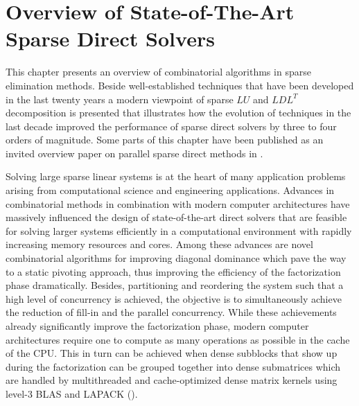 \chapter{Overview of State-of-The-Art Sparse Direct Solvers}

This chapter presents an overview of combinatorial algorithms in sparse elimination methods.
Beside well-established techniques that have been developed in the last twenty years a modern
viewpoint of sparse $LU$ and $LDL^T$ decomposition is presented that illustrates how the
evolution of techniques in the last decade improved the performance of sparse direct solvers by
three to four orders of magnitude. Some parts of this chapter have been published as an invited
overview paper on parallel sparse direct methods in \cite{Bollhofer2020}.

Solving large sparse linear systems is at the heart of many application
problems arising from computational science and engineering applications.
Advances in combinatorial
methods in combination with modern computer architectures have massively
influenced the design of state-of-the-art direct solvers
that are feasible for solving  larger systems efficiently
in a computational environment with rapidly increasing memory resources
and cores. Among these advances are 
novel combinatorial algorithms for improving diagonal dominance which
pave the way to a static pivoting approach, thus improving the 
efficiency of the factorization
phase dramatically. Besides, partitioning and reordering the system
such that a high level of concurrency is achieved, the objective is to 
simultaneously achieve the reduction of fill-in and the parallel concurrency.
While these achievements already significantly improve the factorization
phase, modern computer architectures require one to compute as many operations
as possible in the cache of the CPU. This in turn can be achieved when
dense subblocks that show up during the factorization can be grouped
together into dense submatrices which are handled
by multithreaded and cache-optimized 
dense matrix kernels using level-3 BLAS and LAPACK
(\cite{AndBBDDDGHMOS99}).

